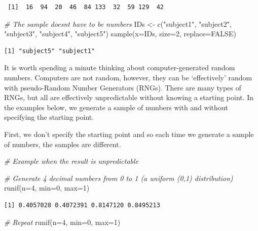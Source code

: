 \documentclass[
  oneside]{krantz}
\newenvironment{Shaded}{\begin{snugshade}}{\end{snugshade}}
\newcommand{\AttributeTok}[1]{\textcolor[rgb]{0.77,0.63,0.00}{#1}}
\newcommand{\CommentTok}[1]{\textcolor[rgb]{0.56,0.35,0.01}{\textit{#1}}}
\newcommand{\ConstantTok}[1]{\textcolor[rgb]{0.00,0.00,0.00}{#1}}
\newcommand{\DecValTok}[1]{\textcolor[rgb]{0.00,0.00,0.81}{#1}}
\newcommand{\FunctionTok}[1]{\textcolor[rgb]{0.00,0.00,0.00}{#1}}
\newcommand{\NormalTok}[1]{#1}
\newcommand{\OtherTok}[1]{\textcolor[rgb]{0.56,0.35,0.01}{#1}}
\newcommand{\StringTok}[1]{\textcolor[rgb]{0.31,0.60,0.02}{#1}}
\begin{document}
\begin{verbatim}
 [1]  16  94  20  46  84 133  32  59 129  42
\end{verbatim}

\begin{Shaded}
\begin{Highlighting}[]
\CommentTok{\# The sample doesn\textquotesingle{}t have to be numbers}
\NormalTok{IDs }\OtherTok{\textless{}{-}} \FunctionTok{c}\NormalTok{(}\StringTok{"subject1"}\NormalTok{, }\StringTok{"subject2"}\NormalTok{, }\StringTok{"subject3"}\NormalTok{, }\StringTok{"subject4"}\NormalTok{, }\StringTok{"subject5"}\NormalTok{)}
\FunctionTok{sample}\NormalTok{(}\AttributeTok{x=}\NormalTok{IDs, }\AttributeTok{size=}\DecValTok{2}\NormalTok{, }\AttributeTok{replace=}\ConstantTok{FALSE}\NormalTok{)}
\end{Highlighting}
\end{Shaded}

\begin{verbatim}
[1] "subject5" "subject1"
\end{verbatim}

It is worth spending a minute thinking about computer-generated random numbers. Computers are not random, however, they can be `effectively' random with pseudo-Random Number Generators (RNGs). There are many types of RNGs, but all are effectively unpredictable without knowing a starting point. In the examples below, we generate a sample of numbers with and without specifying the starting point.

First, we don't specify the starting point and so each time we generate a sample of numbers, the samples are different.

\begin{Shaded}
\begin{Highlighting}[]
\CommentTok{\# Example when the result is unpredictable}

\CommentTok{\# Generate 4 decimal numbers from 0 to 1 (a uniform (0,1) distribution) }
\FunctionTok{runif}\NormalTok{(}\AttributeTok{n=}\DecValTok{4}\NormalTok{, }\AttributeTok{min=}\DecValTok{0}\NormalTok{, }\AttributeTok{max=}\DecValTok{1}\NormalTok{)}
\end{Highlighting}
\end{Shaded}

\begin{verbatim}
[1] 0.4057028 0.4072391 0.8147120 0.8495213
\end{verbatim}

\begin{Shaded}
\begin{Highlighting}[]
\CommentTok{\# Repeat}
\FunctionTok{runif}\NormalTok{(}\AttributeTok{n=}\DecValTok{4}\NormalTok{, }\AttributeTok{min=}\DecValTok{0}\NormalTok{, }\AttributeTok{max=}\DecValTok{1}\NormalTok{)}
\end{Highlighting}
\end{Shaded}
\end{document}
